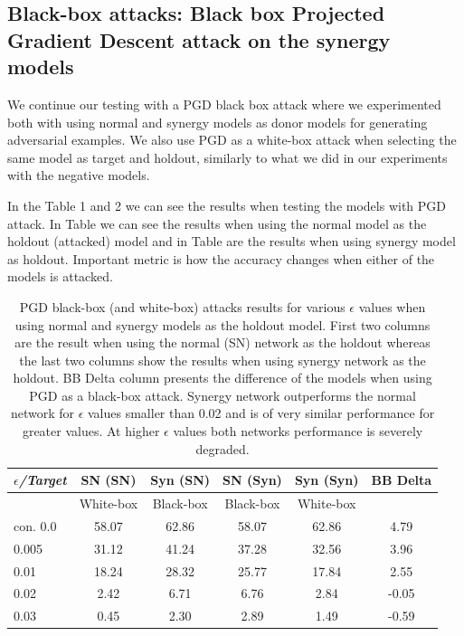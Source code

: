 \documentclass[b5paper]{book}
\begin{document}
\subsection{Black-box attacks: Black box Projected Gradient Descent attack on the synergy models}

We continue our testing with a PGD black box attack where we experimented both with using normal and synergy models as donor models for generating adversarial examples. We also use PGD as a white-box attack when selecting the same model as target and holdout, similarly to what we did in our experiments with the negative models.

In the Table 1 and 2 we can see the results when testing the models with PGD attack. In Table we can see the results when using the normal model as the holdout (attacked) model and in Table are the results when using synergy model as holdout. Important metric is how the accuracy changes when either of the models is attacked.

\begin{table}[ht]
  \centering
  \begin{tabular}{l|cc|cc|c}
    \toprule
     \textit{\(\epsilon\)/Target} & {SN (SN)} & {Syn (SN)} & {SN (Syn)} & {Syn (Syn)} & BB Delta \\
    \midrule
    {} & {White-box} & {Black-box} & {Black-box} & {White-box} & {} \\
    \midrule
    {con. 0.0} & {58.07} & {62.86}  & {58.07} & {62.86} & {4.79} \\
    {0.005} & {31.12} & {41.24}  & {37.28} & {32.56} & {3.96} \\
    {0.01} & {18.24} & {28.32}  & {25.77} & {17.84} & {2.55} \\
    {0.02} & {2.42} & {6.71}  & {6.76} & {2.84} & {-0.05} \\
    {0.03} & {0.45} & {2.30}  & {2.89} & {1.49} & {-0.59} \\
    \bottomrule
  \end{tabular}
  \caption{PGD black-box (and white-box) attacks results for various \( \epsilon \) values when using normal and synergy models as the holdout model. First two columns are the result when using the normal (SN) network as the holdout whereas the last two columns show the results when using synergy network as the holdout. BB Delta column presents the difference of the models when using PGD as a black-box attack. Synergy network outperforms the normal network for \( \epsilon \) values smaller than 0.02 and is of very similar performance for greater values. At higher \( \epsilon \) values both networks performance is severely degraded.}
  \label{tab:results-pgd-synergy}
\end{table} 
\end{document}
